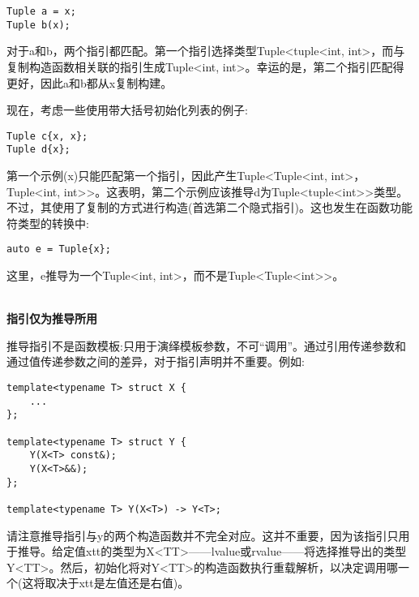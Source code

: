 \begin{lstlisting}[style=styleCXX]
Tuple a = x;
Tuple b(x);
\end{lstlisting}

对于a和b，两个指引都匹配。第一个指引选择类型Tuple<tuple<int, int>，而与复制构造函数相关联的指引生成Tuple<int, int>。幸运的是，第二个指引匹配得更好，因此a和b都从x复制构建。

现在，考虑一些使用带大括号初始化列表的例子:

\begin{lstlisting}[style=styleCXX]
Tuple c{x, x};
Tuple d{x};
\end{lstlisting}

第一个示例(x)只能匹配第一个指引，因此产生Tuple<Tuple<int, int>，Tuple<int, int>{}>。这表明，第二个示例应该推导d为Tuple<tuple<int>{}>类型。不过，其使用了复制的方式进行构造(首选第二个隐式指引)。这也发生在函数功能符类型的转换中:

\begin{lstlisting}[style=styleCXX]
auto e = Tuple{x};
\end{lstlisting}

这里，e推导为一个Tuple<int, int>，而不是Tuple<Tuple<int>{}>。

\hspace*{\fill} \\ %
\noindent
\textbf{指引仅为推导所用}

推导指引不是函数模板:只用于演绎模板参数，不可“调用”。通过引用传递参数和通过值传递参数之间的差异，对于指引声明并不重要。例如:

\begin{lstlisting}[style=styleCXX]
template<typename T> struct X {
	...
};

template<typename T> struct Y {
	Y(X<T> const&);
	Y(X<T>&&);
};

template<typename T> Y(X<T>) -> Y<T>;
\end{lstlisting}

请注意推导指引与y的两个构造函数并不完全对应。这并不重要，因为该指引只用于推导。给定值xtt的类型为X<TT>——lvalue或rvalue——将选择推导出的类型Y<TT>。然后，初始化将对Y<TT>的构造函数执行重载解析，以决定调用哪一个(这将取决于xtt是左值还是右值)。





